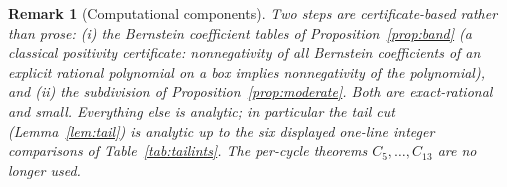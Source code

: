 \documentclass[11pt]{amsart}
\newtheorem{remark}[theorem]{Remark}
\begin{document}
\begin{remark}[Computational components]\label{rem:comp}
Two steps are certificate-based rather than prose: (i) the Bernstein
coefficient tables of Proposition~\ref{prop:band} (a classical positivity
certificate: nonnegativity of all Bernstein coefficients of an explicit
rational polynomial on a box implies nonnegativity of the polynomial), and
(ii) the subdivision of Proposition~\ref{prop:moderate}.  Both are
exact-rational and small.  Everything else is analytic; in particular the
tail cut (Lemma~\ref{lem:tail}) is analytic up to the six displayed
one-line integer comparisons of Table~\ref{tab:tailints}.  The
per-cycle theorems $C_5,\dots,C_{13}$ are no longer used.
\end{remark}
\end{document}
